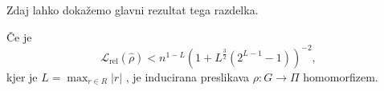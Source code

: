 \documentclass[mat2, tisk]{fmfdelo}
\newcommand{\Loss}[1]{\mathcal L _\text{#1}}
\begin{document}
%
%
Zdaj lahko dokažemo glavni rezultat tega razdelka.
\begin{izrek}
  Če je
  $$
  \Loss{rel}(\hat \rho) <  n^{1-L}(1 +
  L^\frac{3}{2}(2^{L-1}-1))^{-2},
  $$
  kjer je
  $L = \max_{r \in R} |r|$
  , je inducirana preslikava
  $\rho \colon G \to \Pi$ homomorfizem.
\end{izrek}
\end{document}
